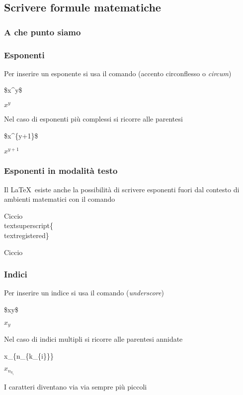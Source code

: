 \subsection{Scrivere formule matematiche}
\begin{frame}
  \frametitle{A che punto siamo}
\end{frame}
\begin{frame}
  \frametitle{Esponenti}
	Per inserire un esponente si usa il comando \LCmd[]{\textasciicircum} (accento circonflesso o \textit{circum})
 	\begin{LaTeXcode}
		\$x\alert{\textasciicircum}y\$
 	\end{LaTeXcode}
	\begin{LaTeXoutput}
		$x^y$
	\end{LaTeXoutput}
	Nel caso di esponenti pi\`u complessi si ricorre alle parentesi
 	\begin{LaTeXcode}
		\$x\textasciicircum \alert{\{y+1\}}\$
 	\end{LaTeXcode}
	\begin{LaTeXoutput}
		$x^{y+1}$
	\end{LaTeXoutput}
\end{frame}
\begin{frame}
  \frametitle{Esponenti in modalit\`a testo}
	Il \LaTeX\ esiste anche la possibilit\`a di scrivere esponenti fuori dal contesto di ambienti matematici con il comando  
 	\begin{LaTeXcode}
		Ciccio\alert{\\textsuperscript\{}\\textregistered\alert{\}}
 	\end{LaTeXcode}
	\begin{LaTeXoutput}
		Ciccio\textsuperscript{\textregistered}
	\end{LaTeXoutput}
\end{frame}
\begin{frame}
  \frametitle{Indici}
	Per inserire un indice si usa il comando \LCmd[]{\textunderscore} (\textit{underscore})
 	\begin{LaTeXcode}
		\$x\alert{\textunderscore}y\$
 	\end{LaTeXcode}
	\begin{LaTeXoutput}
		$x_y$
	\end{LaTeXoutput}
	Nel caso di indici multipli si ricorre alle parentesi annidate
 	\begin{LaTeXcode}
		x\_\{n\_\{\alert{k\_\{i\}}\}\}
 	\end{LaTeXcode}
	\begin{LaTeXoutput}
		$x_{n_{k_{i}}}$
	\end{LaTeXoutput}
	I caratteri diventano via via sempre pi\`u piccoli
\end{frame}
